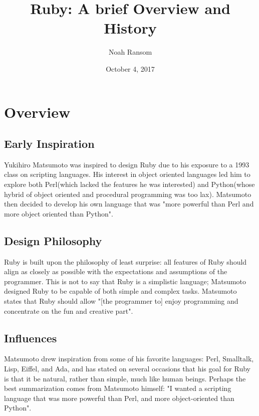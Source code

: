 \documentclass[12pt]{article}
\title{Ruby: A brief Overview and History}
\author{Noah Ransom}
\date{October 4, 2017}
\begin{document}
\maketitle

\pagebreak
\section{Overview}

\subsection{Early Inspiration}
Yukihiro Matsumoto was inspired to design Ruby due to his exposure to a 1993 class on scripting languages. His interest in object oriented languages led him to explore both Perl(which lacked the features he was interested) and Python(whose hybrid of object oriented and procedural programming was too lax)\cite{rubyinterview}. Matsumoto then decided to develop his own language that was "more powerful than Perl and more object oriented than Python"\cite{rubyinterview}.

\subsection{Design Philosophy}
Ruby is built upon the philosophy of least surprise: all features of Ruby should align as closely as possible with the expectations and assumptions of the programmer\cite{rubyinterview}. This is not to say that Ruby is a simplistic language; Matsumoto designed Ruby to be capable of both simple and complex tasks. Matsumoto states that Ruby should allow "[the programmer to] enjoy programming and concentrate on the fun and creative part"\cite{rubyinterview}. 

\subsection{Influences}
Matsumoto drew inspiration from some of his favorite languages: Perl, Smalltalk, Lisp, Eiffel, and Ada, and has stated on several occasions that his goal for Ruby is that it be natural, rather than simple, much like human beings\cite{generalRb}. Perhaps the best summarization comes from Matsumoto himself: "I wanted a scripting language that was more powerful than Perl, and more object-oriented than Python"\cite{rubyinterview}. 
%
%
\end{document}
